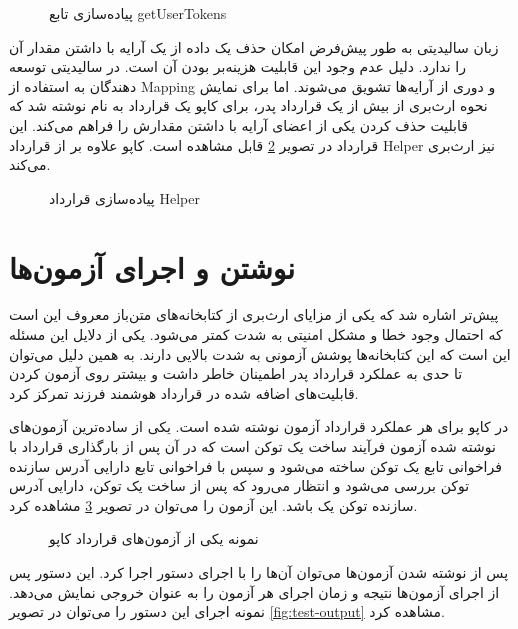 \begin{figure}
\centerline{}
\caption{پیاده‌سازی تابع getUserTokens}
\label{fig:getUserTokens}
\end{figure}

زبان سالیدیتی به طور پیش‌فرض امکان حذف یک داده از یک آرایه با داشتن مقدار آن را ندارد.
دلیل عدم وجود این قابلیت هزینه‌بر بودن آن است.
در سالیدیتی توسعه دهندگان به استفاده از
\gls{Mapping}
و دوری از آرایه‌ها تشویق می‌شوند.
اما برای نمایش نحوه ارث‌بری از بیش از یک قرارداد پدر، برای کاپو یک قرارداد به نام
نوشته شد که قابلیت حذف کردن یکی از اعضای آرایه با داشتن مقدارش را فراهم می‌کند.
این قرارداد در تصویر
\ref{fig:Helper}
قابل مشاهده است. کاپو علاوه بر
از قرارداد Helper نیز ارث‌بری می‌کند.

\begin{figure}
\centerline{}
\caption{پیاده‌سازی قرارداد Helper}
\label{fig:Helper}
\end{figure}

\section{نوشتن و اجرای آزمون‌ها}
پیش‌تر اشاره شد که یکی از مزایای ارث‌بری از کتابخانه‌های متن‌باز معروف
این است که احتمال وجود خطا و مشکل امنیتی به شدت کمتر می‌شود.
یکی از دلایل این مسئله این است که این کتابخانه‌ها پوشش آزمونی به شدت بالایی دارند.
به همین دلیل می‌توان تا حدی به عملکرد قرارداد پدر اطمینان خاطر داشت
و بیشتر روی آزمون کردن قابلیت‌های اضافه شده در قرارداد هوشمند فرزند تمرکز کرد.

در کاپو برای هر عملکرد قرارداد آزمون نوشته شده است.
یکی از ساده‌ترین آزمون‌های نوشته شده آزمون فرآیند ساخت یک توکن است که در آن پس از بارگذاری قرارداد با فراخوانی تابع
یک توکن ساخته می‌شود و سپس با فراخوانی تابع
دارایی آدرس سازنده توکن بررسی می‌شود و انتظار می‌رود که پس از ساخت یک توکن، دارایی آدرس سازنده توکن یک باشد.
این آزمون را می‌توان در تصویر
\ref{fig:mint-test}
مشاهده کرد.

\begin{figure}
\centerline{}
\caption{نمونه یکی از آزمون‌های قرارداد کاپو}
\label{fig:mint-test}
\end{figure}

پس از نوشته شدن آزمون‌ها می‌توان آن‌ها را با اجرای دستور
اجرا کرد.
این دستور پس از اجرای آزمون‌ها نتیجه و زمان اجرای هر آزمون را به عنوان خروجی نمایش می‌دهد.
نمونه اجرای این دستور را می‌توان در تصویر
\ref{fig:test-output}
مشاهده کرد.

